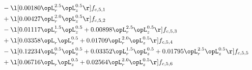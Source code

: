 \begin{alignat}{2}
& - \l[  0.00180 \opL_r^{2.5} \opL_z^{0.5}  \r] f_{c,5,1} \nonumber \\ 
& + \l[  0.00427 \opL_r^{2.0} \opL_z^{0.5}  \r] f_{c,5,2} \nonumber \\ 
& - \l[  0.01117 \opL_r^{1.5} \opL_z^{0.5} +  0.00898 \opL_r^{2.5} \opL_z^{0.5}  \r] f_{c,5,3} \nonumber \\ 
& + \l[  0.03358 \opL_r \opL_z^{0.5} +  0.01709 \opL_r^{2.0} \opL_z^{0.5}  \r] f_{c,5,4} \nonumber \\ 
& - \l[  0.12234 \opL_r^{0.5} \opL_z^{0.5} +  0.03352 \opL_r^{1.5} \opL_z^{0.5} +  0.01795 \opL_r^{2.5} \opL_z^{0.5}  \r] f_{c,5,5} \nonumber \\ 
& + \l[  0.06716 \opL_r \opL_z^{0.5} +  0.02564 \opL_r^{2.0} \opL_z^{0.5}  \r] f_{c,5,6} \nonumber \\ 
\end{alignat} 


